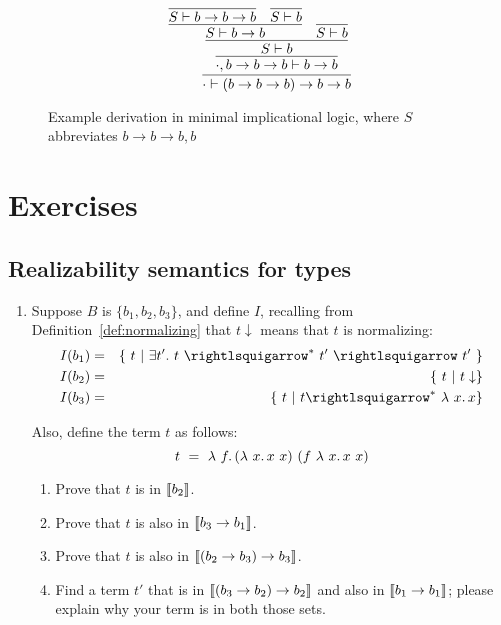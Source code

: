 \begin{figure}
  \[
  \infer{\cdot \vdash  (b \to b \to b) \to b \to b}
        {\infer{\cdot,b \to b \to b \vdash b \to b}
          {\infer{S \vdash b}
            {\infer{S \vdash b \to b}
              {\infer{S \vdash b \to b \to b}{\ }
              & \infer{S \vdash b}{\ }}
            &\infer{S \vdash b}{\ }}}}
  \]
\caption{Example derivation in minimal implicational logic, where $S$ abbreviates $b \to b \to b, b$}
\label{fig:minimplex}
\end{figure}


\section{Exercises}

\subsection{Realizability semantics for types}

\begin{enumerate}
  
\item Suppose $B$ is $\{ b_1, b_2, b_3\}$, and define $I$, recalling
  from Definition~\ref{def:normalizing} that $t\downarrow$ means that $t$
  is normalizing:
\begin{eqnarray*}
I(b_1) & = & \{\ t\ |\ \exists t'.\ t\ \betaa^*\ t'\ \betaa\ t'\ \} \\
I(b_2) & = & \{\ t\ |\ t \downarrow \} \\
I(b_3) & = & \{\ t\ |\ t \betaa^*\ \lam{x}{x} \} \\
\end{eqnarray*}

\noindent Also, define the term $t$ as follows:
\[
t\ =\ \lam{f}{(\lam{x}{x\ x})\ (f\ \lam{x}{x\ x})}
\]

\begin{enumerate}

\item Prove that $t$ is in $\llbracket b_2 \rrbracket$.

\item Prove that $t$ is also in $\llbracket b_3 \to b_1 \rrbracket$.

\item Prove that $t$ is also in $\llbracket (b_2 \to b_3)\to b_3 \rrbracket$.

\item Find a term $t'$ that is in $\llbracket (b_3 \to b_2) \to b_2 \rrbracket$
  and also in $\llbracket b_1 \to b_1 \rrbracket$; please explain why your term is in both those sets. 

\end{enumerate}
\end{enumerate}
 
